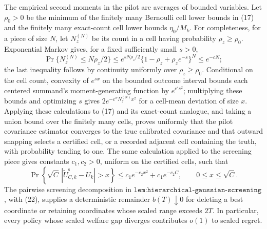 The empirical second moments in the pilot are averages of bounded variables.  Let \(\rho_0>0\) be the minimum of the finitely many Bernoulli cell lower bounds in (17) and the finitely many exact-count cell lower bounds \(\eta_0/M_k\).  For completeness, for a piece of size \(N\), let \(N_z^{(N)}\) be its count in a cell having probability \(\rho_z\geq\rho_0\).  Exponential Markov gives, for a fixed sufficiently small \(s>0\),
\[
 \Pr\{N_z^{(N)}\leq N\rho_z/2\}
 \leq e^{sN\rho_z/2}\{1-\rho_z+\rho_ze^{-s}\}^{N}
 \leq e^{-cN};
\tag{21}
\]
the last inequality follows by continuity uniformly over \(\rho_z\geq\rho_0\).  Conditional on the cell count, convexity of \(e^{sx}\) on the bounded outcome interval bounds each centered summand's moment-generating function by \(e^{c's^2}\); multiplying these bounds and optimizing \(s\) gives \(2e^{-c''N_z^{(N)}x^2}\) for a cell-mean deviation of size \(x\).  Applying these calculations to (17) and its exact-count analogue, and taking a union bound over the finitely many cells, proves uniformly that the pilot covariance estimator converges to the true calibrated covariance and that outward snapping selects a certified cell, or a recorded adjacent cell containing the truth, with probability tending to one.  The same calculation applied to the screening piece gives constants \(c_1,c_2>0\), uniform on the certified cells, such that
\[
 \Pr\!\left\{\sqrt C\,|\widetilde U_{C,k}^{\mathrm s}-U_k|>x\right\}
 \leq c_1e^{-c_2x^2}+c_1e^{-c_2C},
 \qquad 0\leq x\leq\sqrt C.
\tag{22}
\]
The pairwise screening decomposition in \(\texttt{lem:hierarchical-gaussian-screening}\), with (22), supplies a deterministic remainder \(b(T)\downarrow0\) for deleting a best coordinate or retaining coordinates whose scaled range exceeds \(2T\).  In particular, every policy whose scaled welfare gap diverges contributes \(o(1)\) to scaled regret.

